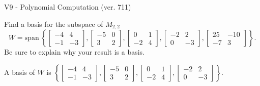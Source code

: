 \begin{exercise}
  \begin{exerciseTitle}V9 - Polynomial Computation (ver. 711)\end{exerciseTitle}
  \begin{exerciseStatement}
    Find a basis for the subspace of \(M_{2,2}\) 
\[W=\mathrm{span}\ \left\{\left[\begin{array}{cc}
-4 & 4 \\
-1 & -3
\end{array}\right] , \left[\begin{array}{cc}
-5 & 0 \\
3 & 2
\end{array}\right] , \left[\begin{array}{cc}
0 & 1 \\
-2 & 4
\end{array}\right] , \left[\begin{array}{cc}
-2 & 2 \\
0 & -3
\end{array}\right] , \left[\begin{array}{cc}
25 & -10 \\
-7 & 3
\end{array}\right]\right\}.\]
 Be sure to explain why your result is a basis.


  \end{exerciseStatement}
  \begin{exerciseAnswer}
   A basis of \(W\) is  \(\left\{\left[\begin{array}{cc}
-4 & 4 \\
-1 & -3
\end{array}\right] , \left[\begin{array}{cc}
-5 & 0 \\
3 & 2
\end{array}\right] , \left[\begin{array}{cc}
0 & 1 \\
-2 & 4
\end{array}\right] , \left[\begin{array}{cc}
-2 & 2 \\
0 & -3
\end{array}\right]\right\}\).
  


  \end{exerciseAnswer}
\end{exercise}